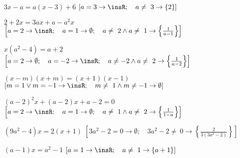 \begin{esercizio}[\Ast]
\begin{enumeratea}
% 
 \item \(3x-a=a(x-3)+6\)
\hfill \(\left[a=3 \rightarrow \insR; \quad a\neq~3 \rightarrow \{2\}\right]\)
 \item \(2+2x=3ax+a-a^{2}x\)
\hfill \(\left[a=2 \rightarrow \insR; \quad 
a=1 \rightarrow \emptyset; \quad 
a\neq~2\wedge a\neq~1 \rightarrow \left\{\frac{1}{a-1}\right\}\right]\)
 \item \(x(a^{2}-4)=a+2\)
\hfill \(\left[a=2 \rightarrow \emptyset; \quad 
a=-2 \rightarrow \insR; \quad 
a\neq -2\wedge a\neq~2 \rightarrow \left\{\frac{1}{a-2}\right\}\right]\)
 \item \((x-m)(x+m)=(x+1)(x-1)\)
\hfill \(\left[m=1\vee m=-1 \rightarrow \insR; \quad 
m\neq~1\wedge m\neq -1 \rightarrow \emptyset\right]\)
 \item \((a-2)^{2}x+(a-2)x+a-2=0\)
\hfill \(\left[a=2 \rightarrow \insR; \quad 
a=1 \rightarrow \emptyset; \quad 
a\neq~1\wedge a\neq~2 \rightarrow \left\{\frac{1}{1-a}\right\}\right]\)
 \item \(\left(9a^{2}-4\right)x=2(x+1)\)
\hfill \(\left[3a^{2}-2=0 \rightarrow \emptyset; \quad 
3a^{2}-2\neq~0 \rightarrow \left\{\frac{2}{3(3a^{2}-2)}\right\}\right]\)
 \item \((a-1)x=a^{2}-1\)
\hfill \(\left[a=1 \rightarrow \insR; \quad 
a\neq~1 \rightarrow \{a+1\}\right]\)

\end{enumeratea}
\end{esercizio}
